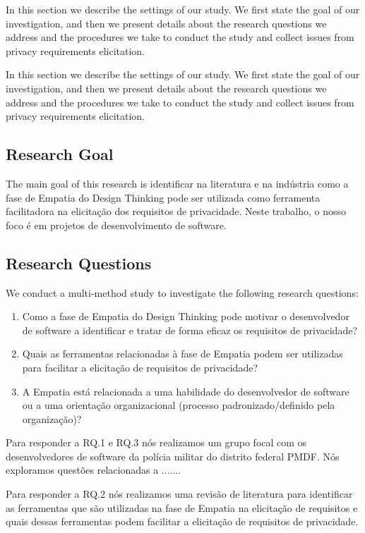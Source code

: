 \documentclass[conference]{IEEEtran}
\begin{document}
In this section we describe the settings of our study. We first state the goal of our investigation, and then we present details about the research questions we address and the procedures we take to conduct the study and collect issues from privacy requirements elicitation.

In this section we describe the settings of our study. We first state the goal of our investigation, and then we present details about the research questions we address and the procedures we take to conduct the study and collect issues from privacy requirements elicitation.

\subsection{Research Goal}

The main goal of this research is identificar na literatura e na indústria como a fase de Empatia do Design Thinking pode ser utilizada como ferramenta facilitadora na elicitação dos requisitos de privacidade. Neste trabalho, o nosso foco é em projetos de desenvolvimento de software. 

\subsection{Research Questions}
\label{rq}  

We conduct a multi-method study to investigate the following research questions:

\begin{enumerate}[RQ.1:]
    \item Como a fase de Empatia do Design Thinking pode motivar o desenvolvedor de software a identificar e tratar de forma eficaz os requisitos de privacidade?
    \item Quais as ferramentas relacionadas à fase de Empatia podem ser utilizadas para facilitar a elicitação de requisitos de privacidade? 
    \item A Empatia está relacionada a uma habilidade do desenvolvedor de software ou a uma orientação organizacional (processo padronizado/definido pela organização)?

\end{enumerate}

Para responder a RQ.1 e RQ.3 nós realizamos um grupo focal com os desenvolvedores de software da polícia militar do distrito federal PMDF. Nós exploramos questões relacionadas a .......

Para responder a RQ.2 nós realizamos uma revisão de literatura para identificar as ferramentas que são utilizadas na fase de Empatia na elicitação de requisitos e quais dessas ferramentas podem facilitar a elicitação de requisitos de privacidade.
\end{document}
